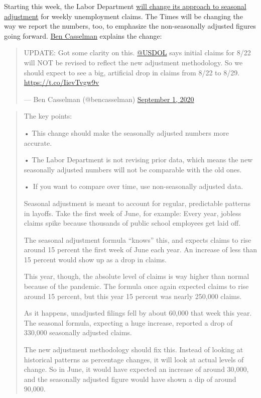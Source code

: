 Starting this week, the Labor Department
\href{https://www.nytimes3xbfgragh.onion/live/2020/09/01/business/stock-market-today-coronavirus/the-labor-department-will-start-counting-unemployment-claims-in-a-new-way}{will
change its approach to seasonal adjustment} for weekly unemployment
claims. The Times will be changing the way we report the numbers, too,
to emphasize the non-seasonally adjusted figures going forward.
\href{https://twitter.com/bencasselman}{Ben Casselman} explains the
change:

\begin{quote}
UPDATE: Got some clarity on this.
\href{https://twitter.com/USDOL?ref_src=twsrc\%5Etfw}{@USDOL} says
initial claims for 8/22 will NOT be revised to reflect the new
adjustment methodology. So we should expect to see a big, artificial
drop in claims from 8/22 to 8/29. \url{https://t.co/IievTvgw9v}

--- Ben Casselman (@bencasselman)
\href{https://twitter.com/bencasselman/status/1300846216306192384?ref_src=twsrc\%5Etfw}{September
1, 2020}
\end{quote}

\begin{quote}
The key points:

• This change should make the seasonally adjusted numbers more accurate.

• The Labor Department is not revising prior data, which means the new
seasonally adjusted numbers will not be comparable with the old ones.

•~If you want to compare over time, use non-seasonally adjusted data.

Seasonal adjustment is meant to account for regular, predictable
patterns in layoffs. Take the first week of June, for example: Every
year, jobless claims spike because thousands of public school employees
get laid off.

The seasonal adjustment formula ``knows'' this, and expects claims to
rise around 15 percent the first week of June each year. An increase of
less than 15 percent would show up as a drop in claims.

This year, though, the absolute level of claims is way higher than
normal because of the pandemic. The formula once again expected claims
to rise around 15 percent, but this year 15 percent was nearly 250,000
claims.

As it happens, unadjusted filings fell by about 60,000 that week this
year. The seasonal formula, expecting a huge increase, reported a drop
of 330,000 seasonally adjusted claims.

The new adjustment methodology should fix this. Instead of looking at
historical patterns as percentage changes, it will look at actual levels
of change. So in June, it would have expected an increase of around
30,000, and the seasonally adjusted figure would have shown a dip of
around 90,000.
\end{quote}

